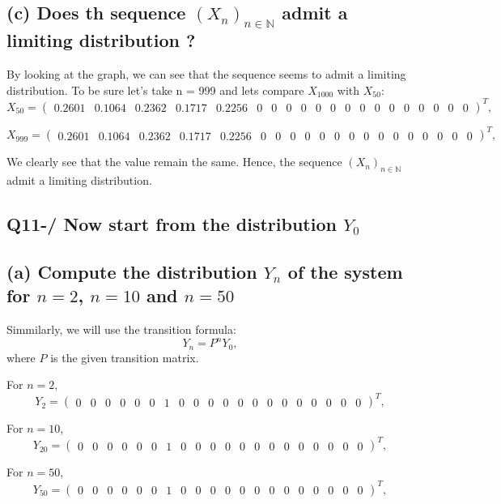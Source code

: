 \documentclass{article}
\begin{document}
    \subsection*{(c) Does th sequence \( (X_n)_{n \in \mathbb{N}} \) admit a limiting distribution ?}
    By looking at the graph, we can see that the sequence seems to admit a limiting distribution. To be sure let's take n = 999 and lets compare \( X_{1000}\) with \( X_{50} \):
    \[
        X_{50} = \begin{pmatrix}
                     0.2601 & 0.1064 & 0.2362 & 0.1717 & 0.2256 & 0 & 0 & 0 & 0 & 0 & 0 & 0 & 0 & 0 & 0 & 0 & 0 & 0 & 0 & 0
        \end{pmatrix}^T,
    \]

    \[
        X_{999} = \begin{pmatrix}
                      0.2601 & 0.1064 & 0.2362 & 0.1717 & 0.2256 & 0 & 0 & 0 & 0 & 0 & 0 & 0 & 0 & 0 & 0 & 0 & 0 & 0 & 0 & 0
        \end{pmatrix}^T,
    \]

    We clearly see that the value remain the same. Hence, the sequence \( (X_n)_{n \in \mathbb{N}} \) admit a limiting distribution.

    \subsection*{Q11-/ Now start from the distribution \( Y_0 \)}
    \subsection*{(a) Compute the distribution \( Y_n \) of the system for \( n = 2\), \(n = 10\) and \(n = 50 \)}
    Simmilarly, we will use the transition formula:
    \[
        Y_n = P^n Y_0,
    \]
    where \( P \) is the given transition matrix.
    \item For \(n = 2\),
    \[
        Y_2 = \begin{pmatrix}
                  0 & 0 & 0 & 0 & 0 & 0 & 1 & 0 & 0 & 0 & 0 & 0 & 0 & 0 & 0 & 0 & 0 & 0 & 0 & 0
        \end{pmatrix}^T,
    \]
    \item For \(n = 10\),
    \[
        Y_{20} = \begin{pmatrix}
                     0 & 0 & 0 & 0 & 0 & 0 & 1 & 0 & 0 & 0 & 0 & 0 & 0 & 0 & 0 & 0 & 0 & 0 & 0 & 0
        \end{pmatrix}^T,
    \]
    \item For \(n = 50\),
    \[
        Y_{50} = \begin{pmatrix}
                     0 & 0 & 0 & 0 & 0 & 0 & 1 & 0 & 0 & 0 & 0 & 0 & 0 & 0 & 0 & 0 & 0 & 0 & 0 & 0
        \end{pmatrix}^T,
    \]
\end{document}
